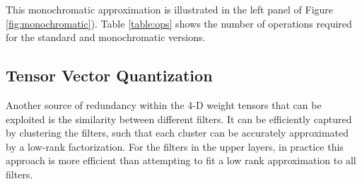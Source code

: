 %
This monochromatic approximation is illustrated in the left panel of Figure \ref{fig:monochromatic}).
Table \ref{table:ops} shows the number of operations required for the standard and monochromatic versions.

\subsection{Tensor Vector Quantization}\label{subsec:clustering}

Another source of redundancy within the 4-D weight tensors that can be exploited 
is the similarity between different filters. 
It can be efficiently captured by clustering the filters, such that each cluster can
be accurately approximated by a low-rank factorization. For the
filters in the upper layers, in practice this approach is more
efficient than attempting to fit a low rank approximation to all
filters. 

